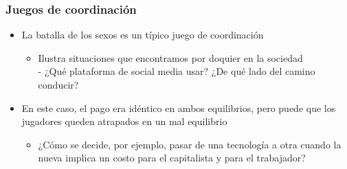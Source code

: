 \documentclass{beamer}
\begin{document}
\begin{frame}
\frametitle{Juegos de coordinación}
\begin{itemize}
        \item La batalla de los sexos es un típico juego de coordinación
        \begin{itemize}
            \item Ilustra situaciones que encontramos por doquier en la sociedad \\
            - ¿Qué plataforma de social media usar? ¿De qué lado del camino conducir?
        \end{itemize}
        \item En este caso, el pago era idéntico en ambos equilibrios, pero puede que los jugadores queden atrapados en un mal equilibrio
        \begin{itemize}
            \item ¿Cómo se decide, por ejemplo, pasar de una tecnología a otra cuando la nueva implica un costo para el capitalista y para el trabajador?
        \end{itemize}
\end{itemize}
\end{frame}
\end{document}
